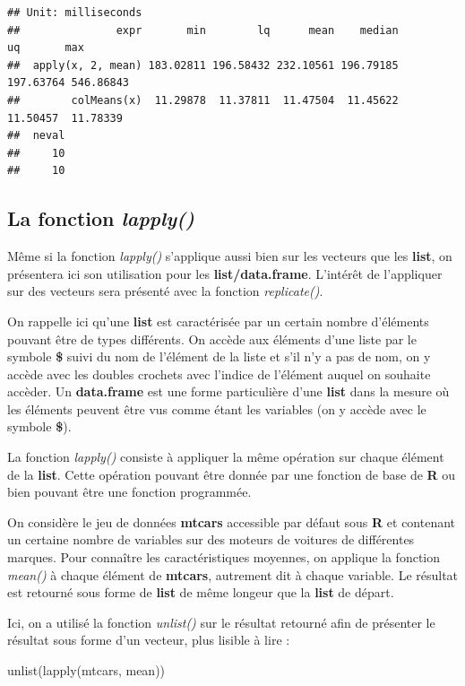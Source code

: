 \documentclass[
]{book}
\newenvironment{Shaded}{\begin{snugshade}}{\end{snugshade}}
\newcommand{\FunctionTok}[1]{\textcolor[rgb]{0.00,0.00,0.00}{#1}}
\newcommand{\NormalTok}[1]{#1}
\theoremstyle{definition}
\theoremstyle{definition}
\theoremstyle{definition}
\theoremstyle{definition}
\theoremstyle{remark}
\begin{document}
\begin{verbatim}
## Unit: milliseconds
##               expr       min        lq      mean    median        uq       max
##  apply(x, 2, mean) 183.02811 196.58432 232.10561 196.79185 197.63764 546.86843
##        colMeans(x)  11.29878  11.37811  11.47504  11.45622  11.50457  11.78339
##  neval
##     10
##     10
\end{verbatim}

\hypertarget{la-fonction-lapply}{%
\subsection{\texorpdfstring{La fonction \emph{lapply()}}{La fonction lapply()}}\label{la-fonction-lapply}}

Même si la fonction \emph{lapply()} s'applique aussi bien sur les vecteurs que les \textbf{list}, on présentera ici son utilisation pour les \textbf{list/data.frame}. L'intérêt de l'appliquer sur des vecteurs sera présenté avec la fonction \emph{replicate()}.

On rappelle ici qu'une \textbf{list} est caractérisée par un certain nombre d'éléments pouvant être de types différents. On accède aux éléments d'une liste par le symbole \textbf{\$} suivi du nom de l'élément de la liste et s'il n'y a pas de nom, on y accède avec les doubles crochets avec l'indice de l'élément auquel on souhaite accèder. Un \textbf{data.frame} est une forme particulière d'une \textbf{list} dans la mesure où les éléments peuvent être vus comme étant les variables (on y accède avec le symbole \textbf{\$}).

La fonction \emph{lapply()} consiste à appliquer la même opération sur chaque élément de la \textbf{list}. Cette opération pouvant être donnée par une fonction de base de \textbf{R} ou bien pouvant être une fonction programmée.

On considère le jeu de données \textbf{mtcars} accessible par défaut sous \textbf{R} et contenant un certaine nombre de variables sur des moteurs de voitures de différentes marques. Pour connaître les caractéristiques moyennes, on applique la fonction \emph{mean()} à chaque élément de \textbf{mtcars}, autrement dit à chaque variable. Le résultat est retourné sous forme de \textbf{list} de même longeur que la \textbf{list} de départ.

Ici, on a utilisé la fonction \emph{unlist()} sur le résultat retourné afin de présenter le résultat sous forme d'un vecteur, plus lisible à lire :

\begin{Shaded}
\begin{Highlighting}[]
\FunctionTok{unlist}\NormalTok{(}\FunctionTok{lapply}\NormalTok{(mtcars, mean))}
\end{Highlighting}
\end{Shaded}
\end{document}
